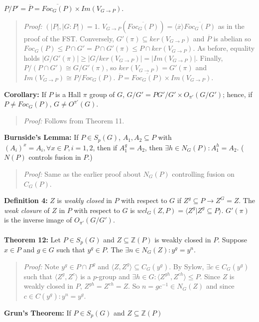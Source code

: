 $P/P' = {\overline P} = {\overline {Foc_G(P)}} \times Im(V_{G \rightarrow P})$.
\begin{quote}
\emph{Proof:}  $(|P|,|G:P|) = 1$.
$V_{G \rightarrow P} ({\overline {Foc_G(P)}}) = \langle {\overline x} \rangle {\overline {Foc_G(P)}}$ as in the
proof of the FST.  Conversely, $G'(\pi) \subseteq ker(V_{G \rightarrow P})$ and ${\overline P}$ is abelian so
$Foc_G(P) \leq P \cap G' = P \cap G'(\pi) \leq P \cap ker(V_{G \rightarrow P})$.  As before, equality holds 
$|G/G'(\pi)| \geq |G/ker(V_{G \rightarrow P})| = |Im(V_{G\rightarrow P})|$.
Finally, $P/(P \cap G') \cong G/G'(\pi)$,
so $ker(V_{G \rightarrow P}) = G'(\pi)$ and $Im(V_{G \rightarrow P}) \cong P/Foc_G(P)$.
${\overline P} = {\overline {Foc_G(P)}} \times Im(V_{G \rightarrow P})$.
\end{quote}
{\bf Corollary:} If $P$ is a Hall $\pi$
group of $G$, $G/G'= PG'/G' \times O_{\pi'}(G/G')$; hence, if $P \ne Foc_G(P)$,
$G \ne O^{\pi'}(G)$.
\begin{quote}
\emph{Proof:}  
Follows from Theorem 11.
\end{quote}
{\bf Burnside's Lemma:}  If $P \in S_p(G)$, $A_1, A_2 \subseteq P$ with 
$(A_i)^x = A_i, \forall x \in P, i= 1, 2$, then
if $A_1^g=A_2$, then $\exists h \in N_G(P): A_1^h=A_2$. ($N(P)$ controls fusion in $P$.)
\begin{quote}
\emph{Proof:}  
Same as the earlier proof about $N_G(P)$ controlling fusion on $C_G(P)$.
\end{quote}
{\bf Definition 4:}
$Z$ is \emph {weakly closed} in $P$ with respect to $G$ if $Z^g \subseteq P \rightarrow Z^G=Z$.
The \emph {weak closure} of $Z$ in $P$ with respect to $G$ is 
$wcl_G(Z, P)= \langle Z^g| Z^g \subseteq P \rangle$.  $G'(\pi)$ is the inverse image of
$O_{\pi'}(G/G')$.
\\
\\
{\bf Theorem 12:}
Let $P \in S_p(G)$ and $Z \subseteq {\mathbb Z}(P)$ 
is weakly closed in $P$.  Suppose $x \in P$ and $g \in G$ such that
$y^g \in P$.  The $\exists n \in N_G(Z): y^g=y^n$.
\begin{quote}
\emph{Proof:}  
Note $y^g \in P \cap P^g$ and $ \langle Z, Z^g \rangle \subseteq C_G(y^g )$.  By Sylow,
$\exists c \in C_G(y^g )$ such that 
$ \langle Z^g, Z^c \rangle $ is a $p$-group and $\exists h \in G:
\langle Z^{gh}, Z^{ch} \rangle \le P$.  Since $Z$ is weakly closed in $P$, 
$Z^{gh}= Z^{ch}= Z$. So
$n= g c^{-1} \in N_G(Z)$ and since $c \in C(y^g): y^n= y^g$.
\end{quote}
{\bf Grun's Theorem:} If $P \in S_p(G)$ and $Z \subseteq {\mathbb Z}(P)$ 

